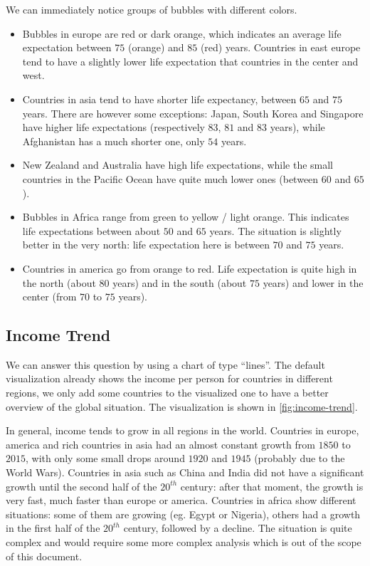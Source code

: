 We can immediately notice groups of bubbles with different colors.
\begin{itemize}
	\item Bubbles in europe are red or dark orange, which indicates an average life expectation between $75$ (orange) and $85$ (red) years.	Countries in east europe tend to have a slightly lower life expectation that countries in the center and west.
	\item Countries in asia tend to have shorter life expectancy, between $65$ and $75$ years. There are however some exceptions: Japan, South Korea and Singapore have higher life expectations (respectively $83$, $81$ and $83$ years), while Afghanistan has a much shorter one, only $54$ years.
	\item New Zealand and Australia have high life expectations, while the small countries in the Pacific Ocean have quite much lower ones (between $60$ and $65$).
	\item Bubbles in Africa range from green to yellow / light orange. This indicates life expectations between about $50$ and $65$ years. The situation is slightly better in the very north: life expectation here is between $70$ and $75$ years.
	\item Countries in america go from orange to red. Life expectation is quite high in the north (about $80$ years) and in the south (about $75$ years) and lower in the center (from $70$ to $75$ years).
\end{itemize}


\subsection{Income Trend}
We can answer this question by using a chart of type ``lines''.
The default visualization already shows the income per person for countries in different regions,
we only add some countries to the visualized one to have a better overview of the global situation.
The visualization is shown in \cref{fig:income-trend}.

In general, income tends to grow in all regions in the world.
Countries in europe, america and rich countries in asia had an almost constant growth from $1850$ to $2015$, with only some small drops around $1920$ and $1945$ (probably due to the World Wars).
Countries in asia such as China and India did not have a significant growth until the second half of the $20^{th}$ century:
after that moment, the growth is very fast, much faster than europe or america.
Countries in africa show different situations:
some of them are growing (eg. Egypt or Nigeria), others had a growth in the first half of the $20^{th}$ century, followed by a decline.
The situation is quite complex and would require some more complex analysis which is out of the scope of this document.

